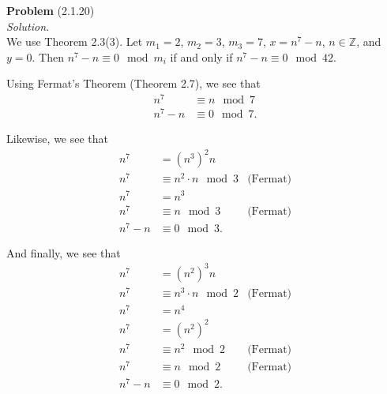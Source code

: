 \documentclass[12 pt]{amsart}
\begin{document}
\vfill
\newpage



\phantom{\quad} \vfill
\noindent
\textbf{Problem} (2.1.20) \\[4ex]
\emph{Solution.} \\[2ex]
  We use Theorem 2.3(3).
  Let $m_1 = 2$, $m_2 = 3$, $m_3 = 7$, $x = n^7 - n$, 
  $n \in \mathbb{Z}$, and 
  $y = 0$.
  Then $n^7 - n \equiv 0 \mod m_i$ if and only if 
  $n^7 - n \equiv 0 \mod 42$.

  Using Fermat's Theorem (Theorem 2.7), we see that 
  \begin{align*}
    n^7 &\equiv n \mod 7 \\
    n^7 - n &\equiv 0 \mod 7.
  \end{align*}

  Likewise, we see that 
  \begin{align*}
    n^7     &= \left( n^3 \right)^2 n \\
    n^7     &\equiv n^2 \cdot n \mod 3 & \text{(Fermat)}\\
    n^7     &= n^3 \\
    n^7     & \equiv n \mod 3 & \text{(Fermat)}  \\
    n^7-n   & \equiv 0 \mod 3.
  \end{align*}

  And finally, we see that 
  \begin{align*}
    n^7 &= \left( n^2 \right)^3 n \\
    n^7    &\equiv n^3 \cdot n  \mod 2 & \text{(Fermat)}\\
    n^7    &= n^4 \\
    n^7    &= \left( n^2 \right)^2 \\
    n^7    &\equiv n^2  \mod 2 & \text{(Fermat)}\\
    n^7    &\equiv n \mod 2 & \text{(Fermat)} \\
    n^7-n  &\equiv 0 \mod 2.
  \end{align*}
\end{document}
